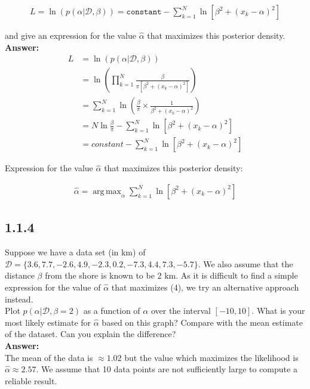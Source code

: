\documentclass[a4paper]{article}
\DeclareMathOperator*{\argmax}{arg\,max}
\begin{document}
\begin{eqnarray}
L = \ln (p(\alpha | \mathcal{D, \beta})) = \texttt{constant} - \sum_{k = 1}^N \ln [\beta^2 + (x_k - \alpha)^2] 
\end{eqnarray}

and give an expression for the value $\hat{\alpha}$ that maximizes this posterior density.\\

\textbf{Answer:}\\

\begin{align*}
L &= \ln(p(\alpha|\mathcal{D}, \beta))\\
&= \ln(\prod_{k=1}^N \frac{\beta}{\pi [\beta^2 + (x_k - \alpha)^2]})\\
&= \sum_{k=1}^N \ln (\frac{\beta}{\pi} \times \frac{1}{\beta^2 + (x_k - \alpha)^2})\\
&= N \ln \frac{\beta}{\pi} - \sum_{k=1}^N \ln [\beta^2 + (x_k - \alpha)^2]\\
&= constant - \sum_{k = 1}^N \ln [\beta^2 + (x_k - \alpha)^2]
\end{align*}

Expression for the value $\hat{\alpha}$ that maximizes this posterior density:

\begin{align*}
\hat{\alpha} = \argmax_\alpha \sum_{k = 1}^N \ln [\beta^2 + (x_k - \alpha)^2]
\end{align*}

\subsection*{1.1.4}

Suppose we have a data set (in km) of $\mathcal{D} = \{ 3.6, 7.7, -2.6, 4.9, -2.3, 0.2, -7.3, 4.4, 7.3, -5.7\}$. We also assume that the distance $\beta$ from the shore is known to be 2 km. As it is difficult to find a simple expression for the value of $\hat{\alpha}$ that maximizes (4), we try an alternative approach instead.\\

Plot $p(\alpha|\mathcal{D}, \beta = 2)$ as a function of $\alpha$ over the interval $[-10, 10]$. What is your most likely estimate for $\hat{\alpha}$ based on this graph? Compare with the mean estimate of the dataset. Can you explain the difference?\\


\textbf{Answer:}\\

The mean of the data is $ \approx 1.02$ but the value which maximizes the likelihood is $\hat{\alpha}\approx 2.57$. We assume that 10 data points are not sufficiently large to compute a reliable result.
\end{document}
